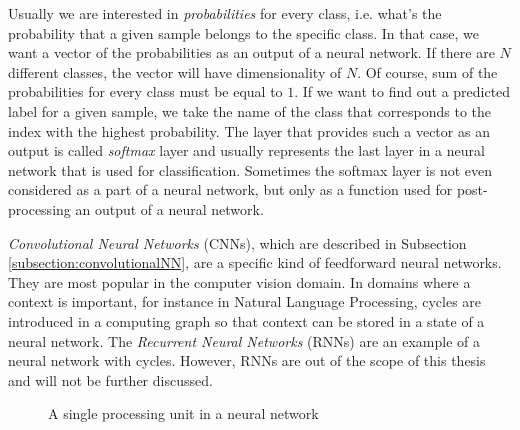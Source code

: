 Usually we are interested in \textit{probabilities} for every class, i.e. what's the probability that a given sample belongs to the specific class. In that case, we want a vector of the probabilities as an output of a neural network. If there are $N$ different classes, the vector will have dimensionality of $N$. Of course, sum of the probabilities for every class must be equal to $1$. If we want to find out a predicted label for a given sample, we take the name of the class that corresponds to the index with the highest probability. The layer that provides such a vector as an output is called \textit{softmax} layer and usually represents the last layer in a neural network that is used for classification. Sometimes the softmax layer is not even considered as a part of a neural network, but only as a function used for post-processing an output of a neural network.

 \textit{Convolutional Neural Networks} (CNNs), which are described in Subsection \ref{subsection:convolutionalNN}, are a specific kind of feedforward neural networks. They are most popular in the computer vision domain. In domains where a context is important, for instance in Natural Language Processing, cycles are introduced in a computing graph so that context can be stored in a state of a neural network.  The \textit{Recurrent Neural Networks} (RNNs) are an example of a neural network with cycles. However, RNNs are out of the scope of this thesis and will not be further discussed.

\begin{figure}
\caption{A single processing unit in a neural network}
\label{fig:basic-neuron}
\end{figure}